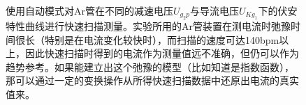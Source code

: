 \documentclass[UTF8]{ctexart}
\begin{document}
\begin{figure}
  \centering
  \\
  \caption{使用自动模式对Ar管在不同的减速电压$U_{g_2p}$与导流电压$U_{Kg_1}$下的伏安特性曲线进行快速扫描测量。实验所用的Ar管装置在测电流时弛豫时间很长（特别是在电流变化较快时），而扫描的速度可达140bpm以上，因此快速扫描时得到的电流作为测量值远不准确，但仍可以作为趋势参考。如果能建立出这个弛豫的模型（比如知道是指数函数），那可以通过一定的变换操作从所得快速扫描数据中还原出电流的真实值来。}
\end{figure}


\end{document}
